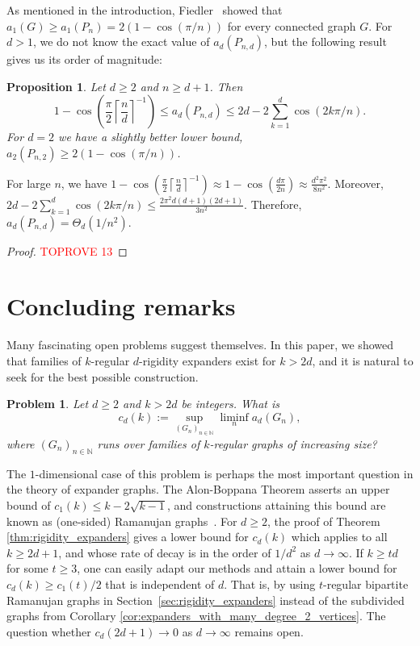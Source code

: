 \documentclass[a4paper,11pt]{article}
\theoremstyle{plain}
\newtheorem{problem}[theorem]{\bf Problem}
\newtheorem{proposition}[theorem]{\bf Proposition}
\theoremstyle{definition}
\newcommand{\ufrac}[2]{\left\lceil\frac{#1}{#2}\right\rceil}
\begin{document}
As mentioned in the introduction, Fiedler~\cite{fiedler1973algebraic} showed that $a_1(G)\geq a_1(P_n)=2(1-\cos(\pi/n))$ for every connected graph $G$.
For $d>1$, we do not know the exact value of $a_d(P_{n,d})$, but the following result gives us its order of magnitude:

\begin{proposition}\label{prop:generalized_path_graph}
Let $d\geq 2$ and $n\geq d+1$. Then
\[
    1-\cos\left(\frac{\pi}{2} \ufrac{n}{d}^{-1}\right)
    \leq 
    a_d(P_{n,d})
    \leq
    2d-2\sum_{k=1}^d \cos(2k\pi/n).
\]
For $d=2$ we have a slightly better lower bound, $a_2(P_{n,2})\geq 2(1-\cos(\pi/n))$.
\end{proposition}
For large $n$, we have $1-\cos\left(\frac{\pi}{2}\ufrac{n}{d}^{-1}\right) \approx 1-\cos\left(\frac{d\pi}{2n}\right)\approx \frac{d^2 \pi^2}{8n^2}$.
Moreover, $2d-2\sum_{k=1}^d \cos(2k\pi/n)\leq \frac{2\pi^2 d(d+1)(2d+1)}{3 n^2}$.
Therefore, $a_d(P_{n,d})=\Theta_d(1/n^2)$.

\begin{proof}\textcolor{red}{TOPROVE 13}\end{proof}






\section{Concluding remarks}\label{sec:concluding}
Many fascinating open problems suggest themselves. In this paper, we showed that families of $k$-regular $d$-rigidity expanders exist for $k>2d$, and it is natural to seek for the best possible construction.
\begin{problem}
Let $d \ge 2$ and $k>2d$ be integers. What is 
$$
c_d(k) := \sup_{(G_n)_{n\in\mathbb N}}\liminf_n a_d(G_n),
$$
where $(G_n)_{n\in\mathbb N}$ runs over families of $k$-regular graphs of increasing size?
\end{problem}
The $1$-dimensional case of this problem is perhaps the most important question in the theory of expander graphs. The Alon-Boppana Theorem asserts an upper bound of $c_1(k)\le k-2\sqrt{k-1}$, and constructions attaining this bound are known as (one-sided) Ramanujan graphs~\cite{LPS,MSS}. 
For $d\ge 2$, the proof of Theorem \ref{thm:rigidity_expanders} gives a lower bound for $c_d(k)$ which applies to all $k\ge 2d+1$, and whose rate of decay is in the order of $1/d^2$ as $d\to\infty$. If $k\ge td$ for some $t\geq 3$, one can easily adapt our methods and attain a lower bound for $c_d(k) \ge c_1(t)/2$ that is independent of $d$. That is, by using $t$-regular bipartite Ramanujan graphs in Section~\ref{sec:rigidity_expanders} instead of the subdivided graphs from Corollary \ref{cor:expanders_with_many_degree_2_vertices}. The question whether $c_d(2d+1)\to 0$ as $d\to\infty$ remains open.
\end{document}
